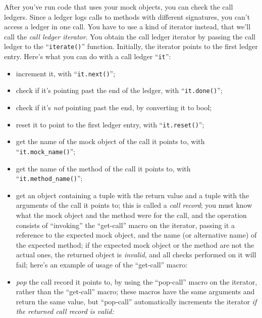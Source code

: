 \documentclass[twoside, a4paper, article]{memoir}
\providecommand\typesetexample[1]{%
}
\begin{document}
After you've run code that uses your mock objects, you can check the call
ledgers.  Since a ledger logs calls to methods with different signatures, you
can't access a ledger in one call.  You have to use a kind of iterator instead,
that we'll call the \emph{call ledger iterator}.  You obtain the call ledger
iterator by passing the call ledger to the ``\texttt{iterate()}'' function.
Initially, the iterator points to the first ledger entry.  Here's what you can
do with a call ledger ``\texttt{it}'':
\begin{itemize}
\item increment it, with ``\texttt{it.next()}'';
\item check if it's pointing past the end of the ledger, with
  ``\texttt{it.done()}'';
\item check if it's \emph{not} pointing past the end, by converting it to bool;
\item reset it to point to the first ledger entry, with
  ``\texttt{it.reset()}'';
\item get the name of the mock object of the call it points to, with
  ``\texttt{it.mock\_name()}'';
\item get the name of the method of the call it points to, with
  ``\texttt{it.method\_name()}'';
\item get an object containing a tuple with the return value and a tuple with
  the arguments of the call it points to; this is called a \emph{call record};
  you must know what the mock object and the method were for the call, and the
  operation consists of ``invoking'' the ``get-call'' macro on the iterator,
  passing it a reference to the expected mock object, and the name (or
  alternative name) of the expected method; if the expected mock object or the
  method are not the actual ones, the returned object is \emph{invalid}, and
  all checks performed on it will fail; here's an example of usage of the
  ``get-call'' macro:

  \typesetexample{ledger-iterator-get-call}

\item \emph{pop} the call record it points to, by using the ``pop-call'' macro
  on the iterator, rather than the ``get-call'' macro; these macros have the
  same arguments and return the same value, but ``pop-call'' automatically
  increments the iterator \emph{if the returned call record is valid:}

  \typesetexample{ledger-iterator-pop-call}
\end{itemize}
\end{document}
